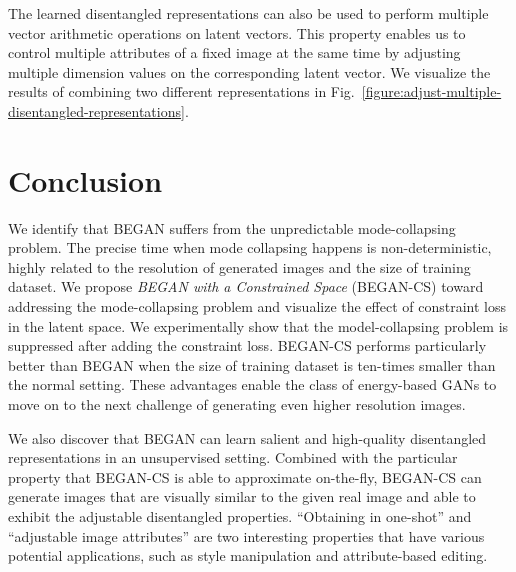 \documentclass[runningheads]{llncs}
\begin{document}
    The learned disentangled representations can also be used to perform multiple vector arithmetic operations on latent vectors. This property enables us to control multiple attributes of a fixed image at the same time by adjusting multiple dimension values on the corresponding latent vector. We visualize the results of combining two different representations in Fig.~\ref{figure:adjust-multiple-disentangled-representations}.
    

\section{Conclusion}
    
    We identify that BEGAN suffers from the unpredictable mode-collapsing problem. The precise time when mode collapsing happens is non-deterministic, highly related to the resolution of generated images and the size of training dataset. We propose \emph{BEGAN with a Constrained Space} (BEGAN-CS) toward addressing the mode-collapsing problem and visualize the effect of constraint loss in the latent space. We experimentally show that the model-collapsing problem is suppressed after adding the constraint loss. BEGAN-CS performs particularly better than BEGAN when the size of training dataset is ten-times smaller than the normal setting. These advantages enable the class of energy-based GANs to move on to the next challenge of generating even higher resolution images.
    
    We also discover that BEGAN can learn salient and high-quality disentangled representations in an unsupervised setting. Combined with the particular property that BEGAN-CS is able to approximate  on-the-fly, BEGAN-CS can generate images that are visually similar to the given real image and able to exhibit the adjustable disentangled properties. ``Obtaining  in one-shot'' and ``adjustable image attributes'' are two interesting properties that have various potential applications, such as style manipulation and attribute-based editing.
    
\end{document}

